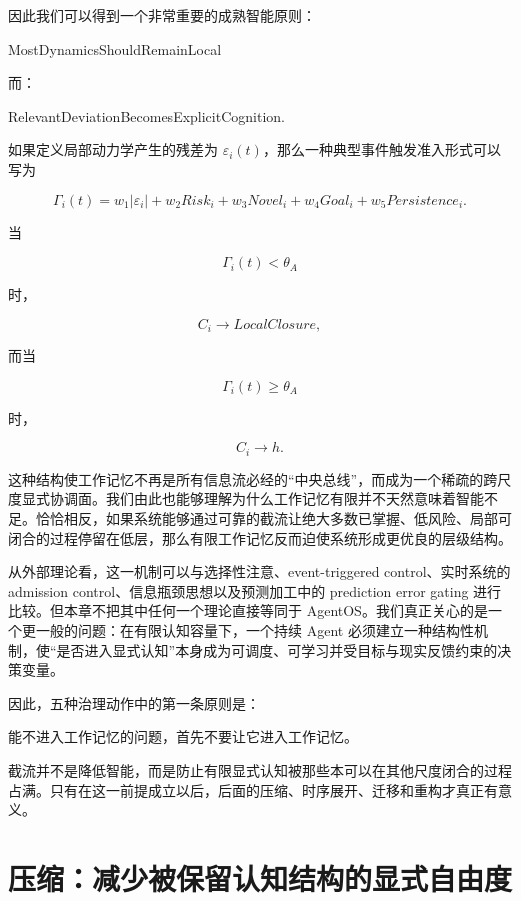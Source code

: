 因此我们可以得到一个非常重要的成熟智能原则：

\begin{statementbox}
MostDynamicsShouldRemainLocal
\end{statementbox}

而：

\begin{statementbox}
RelevantDeviationBecomesExplicitCognition.
\end{statementbox}

如果定义局部动力学产生的残差为 $\varepsilon_i(t)$，那么一种典型事件触发准入形式可以写为

\[
\Gamma_i(t)
=
w_1|\varepsilon_i|
+
w_2 Risk_i
+
w_3 Novel_i
+
w_4 Goal_i
+
w_5 Persistence_i.
\]

当

\[
\Gamma_i(t)<\theta_A
\]

时，

\[
C_i
\rightarrow
LocalClosure,
\]

而当

\[
\Gamma_i(t)\geq\theta_A
\]

时，

\[
C_i
\rightarrow
h.
\]

这种结构使工作记忆不再是所有信息流必经的“中央总线”，而成为一个稀疏的跨尺度显式协调面。我们由此也能够理解为什么工作记忆有限并不天然意味着智能不足。恰恰相反，如果系统能够通过可靠的截流让绝大多数已掌握、低风险、局部可闭合的过程停留在低层，那么有限工作记忆反而迫使系统形成更优良的层级结构。

从外部理论看，这一机制可以与选择性注意、event-triggered control、实时系统的 admission control、信息瓶颈思想以及预测加工中的 prediction error gating 进行比较。但本章不把其中任何一个理论直接等同于 AgentOS。我们真正关心的是一个更一般的问题：在有限认知容量下，一个持续 Agent 必须建立一种结构性机制，使“是否进入显式认知”本身成为可调度、可学习并受目标与现实反馈约束的决策变量。

因此，五种治理动作中的第一条原则是：

\begin{proposition*}
能不进入工作记忆的问题，首先不要让它进入工作记忆。
\end{proposition*}

截流并不是降低智能，而是防止有限显式认知被那些本可以在其他尺度闭合的过程占满。只有在这一前提成立以后，后面的压缩、时序展开、迁移和重构才真正有意义。

\section{压缩：减少被保留认知结构的显式自由度}

